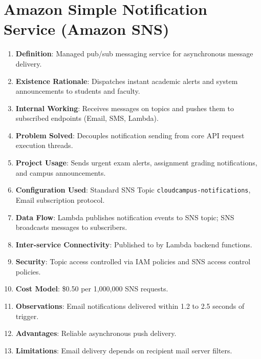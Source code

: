 \section{Amazon Simple Notification Service (Amazon SNS)}
\begin{enumerate}
    \item \textbf{Definition}: Managed pub/sub messaging service for asynchronous message delivery.
    \item \textbf{Existence Rationale}: Dispatches instant academic alerts and system announcements to students and faculty.
    \item \textbf{Internal Working}: Receives messages on topics and pushes them to subscribed endpoints (Email, SMS, Lambda).
    \item \textbf{Problem Solved}: Decouples notification sending from core API request execution threads.
    \item \textbf{Project Usage}: Sends urgent exam alerts, assignment grading notifications, and campus announcements.
    \item \textbf{Configuration Used}: Standard SNS Topic \texttt{cloudcampus-notifications}, Email subscription protocol.
    \item \textbf{Data Flow}: Lambda publishes notification events to SNS topic; SNS broadcasts messages to subscribers.
    \item \textbf{Inter-service Connectivity}: Published to by Lambda backend functions.
    \item \textbf{Security}: Topic access controlled via IAM policies and SNS access control policies.
    \item \textbf{Cost Model}: \$0.50 per 1,000,000 SNS requests.
    \item \textbf{Observations}: Email notifications delivered within 1.2 to 2.5 seconds of trigger.
    \item \textbf{Advantages}: Reliable asynchronous push delivery.
    \item \textbf{Limitations}: Email delivery depends on recipient mail server filters.
\end{enumerate}

